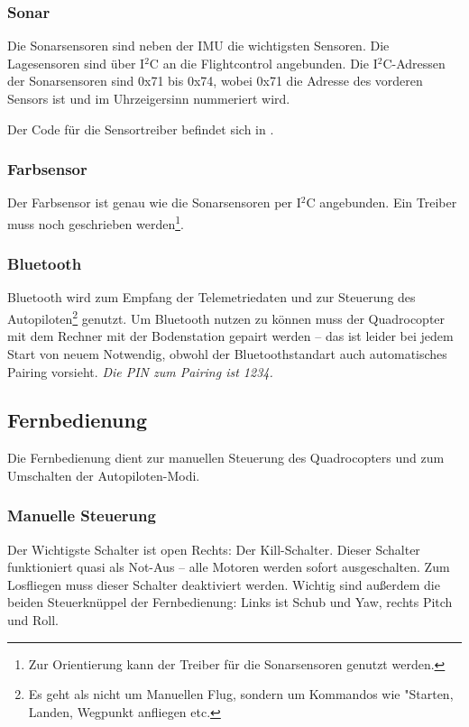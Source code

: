 \subsubsection{Sonar}
Die Sonarsensoren sind neben der IMU die wichtigsten Sensoren. Die Lagesensoren sind über I$^2$C an die Flightcontrol angebunden.
Die I$^2$C-Adressen der Sonarsensoren sind 0x71 bis 0x74, wobei 0x71 die Adresse des vorderen Sensors ist und im Uhrzeigersinn nummeriert wird.

Der Code für die Sensortreiber befindet sich in .

\subsubsection{Farbsensor}
Der Farbsensor ist genau wie die Sonarsensoren per I$^2$C angebunden. Ein Treiber muss noch geschrieben werden\footnote{Zur Orientierung kann der Treiber für die Sonarsensoren genutzt werden.}.


\subsubsection{Bluetooth}
Bluetooth wird zum Empfang der Telemetriedaten und zur Steuerung des Autopiloten\footnote{Es geht als nicht um Manuellen Flug, sondern um Kommandos wie "Starten, Landen, Wegpunkt anfliegen etc.} genutzt.
Um Bluetooth nutzen zu können muss der Quadrocopter mit dem Rechner mit der Bodenstation gepairt werden – das ist leider bei jedem Start von neuem Notwendig, obwohl der Bluetoothstandart auch automatisches Pairing vorsieht.
\emph{Die PIN zum Pairing ist 1234.}


\subsection{Fernbedienung}
Die Fernbedienung dient zur manuellen Steuerung des Quadrocopters und zum Umschalten der Autopiloten-Modi.

\subsubsection{Manuelle Steuerung}
Der Wichtigste Schalter ist open Rechts: Der Kill-Schalter. Dieser Schalter funktioniert quasi als Not-Aus – alle Motoren werden sofort ausgeschalten.
Zum Losfliegen muss dieser Schalter deaktiviert werden.
Wichtig sind außerdem die beiden Steuerknüppel der Fernbedienung: Links ist Schub und Yaw, rechts Pitch und Roll.


